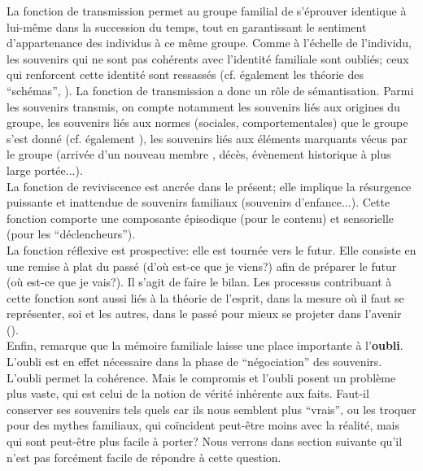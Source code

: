 \documentclass[french]{article}
\begin{document}
			La fonction de transmission permet au groupe familial de s'éprouver identique à lui-même dans la succession du temps, tout en garantissant le sentiment d'appartenance des individus à ce même groupe. Comme à l'échelle de l'individu, les souvenirs qui ne sont pas cohérents avec l'identité familiale sont oubliés; ceux qui renforcent cette identité sont ressassés (cf. également les théorie des ``schémas'', \cite{bartlett1933}). La fonction de transmission a donc un rôle de sémantisation. Parmi les souvenirs transmis, on compte notamment les souvenirs liés aux origines du groupe, les souvenirs liés aux normes (sociales, comportementales) que le groupe s'est donné (cf. également \cite[p.~110-111]{halbwachs1925}), les souvenirs liés aux éléments marquants vécus par le groupe (arrivée d'un nouveau membre \cite[p.~121]{halbwachs1925}, décès, évènement historique à plus large portée...).\\
			
			La fonction de reviviscence est ancrée dans le présent; elle implique la résurgence puissante et inattendue de souvenirs familiaux (souvenirs d'enfance...). Cette fonction comporte une composante épisodique (pour le contenu) et sensorielle (pour les ``déclencheurs'').\\
			
			La fonction réflexive est prospective: elle est tournée vers le futur. Elle consiste en une remise à plat du passé (d'où est-ce que je viens?) afin de préparer le futur (où est-ce que je vais?). Il s'agit de faire le bilan. Les processus contribuant à cette fonction sont aussi liés à la théorie de l'esprit, dans la mesure où il faut se représenter, soi et les autres, dans le passé pour mieux se projeter dans l'avenir (\cite{buckner2007}). \\
			
			Enfin, \cite{muxel2012} remarque que la mémoire familiale laisse une place importante à l'\textbf{oubli}. L'oubli est en effet nécessaire dans la phase de ``négociation'' des souvenirs. L'oubli permet la cohérence. Mais le compromis et l'oubli posent un problème plus vaste, qui est celui de la notion de vérité inhérente aux faits. Faut-il conserver ses souvenirs tels quels car ils nous semblent plus ``vrais'', ou les troquer pour des mythes familiaux, qui coïncident peut-être moins avec la réalité, mais qui sont peut-être plus facile à porter? Nous verrons dans section suivante qu'il n'est pas forcément facile de répondre à cette question.
			
	
\end{document}

